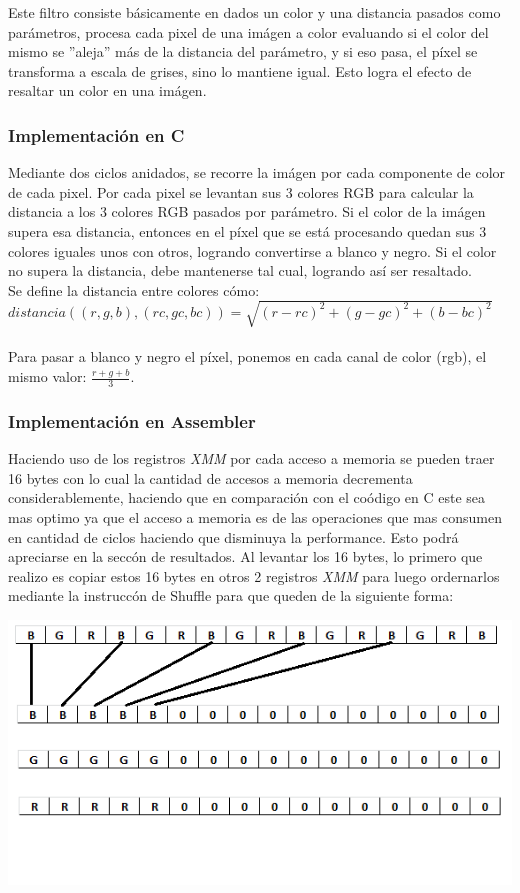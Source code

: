 Este filtro consiste b\'asicamente en dados un color y una distancia pasados como par\'ametros, procesa cada pixel de una im\'agen a color evaluando si el color del mismo se ''aleja'' m\'as de la distancia del par\'ametro, y si eso pasa, el p\'ixel se transforma a escala de grises, sino lo mantiene igual. Esto logra el efecto de resaltar un color en una im\'agen.

\subsubsection{Implementación en C}
Mediante dos ciclos anidados, se recorre la im\'agen por cada componente de color de cada pixel. Por cada pixel se levantan sus 3 colores RGB para calcular la distancia a los 3 colores RGB pasados por par\'ametro. Si el color de la im\'agen supera esa distancia, entonces en el p\'ixel que se est\'a procesando quedan sus 3 colores iguales unos con otros, logrando convertirse a blanco y negro. Si el color no supera la distancia, debe mantenerse tal cual, logrando as\'i ser resaltado.\\
Se define la distancia entre colores c\'omo:\\
$distancia((r, g, b), (rc, gc, bc)) = \sqrt{(r − rc)^2 + (g − gc)^2 + (b − bc)^2}$\\\\
Para pasar a blanco y negro el p\'ixel, ponemos en cada canal de color (rgb), el mismo valor: $\frac{r + g + b}{3}$.

\subsubsection{Implementación en Assembler}
Haciendo uso de los registros \emph{XMM} por cada acceso a memoria se pueden traer 16 bytes con lo cual la cantidad de accesos a memoria decrementa 
considerablemente, haciendo que en comparaci\'on con el co\'odigo en C este sea mas optimo ya que el acceso a memoria es de las operaciones que mas 
consumen en cantidad de ciclos haciendo que disminuya la performance. Esto podr\'a apreciarse en la secc\'on de resultados.\newline
Al levantar los 16 bytes, lo primero que realizo es copiar estos 16 bytes en otros 2 registros \emph{XMM} para luego ordernarlos mediante la instrucc\'on
de Shuffle para que queden de la siguiente forma:

\begin{center}
\includegraphics{imagenes/ImagenReorden.png}  
\end{center}

